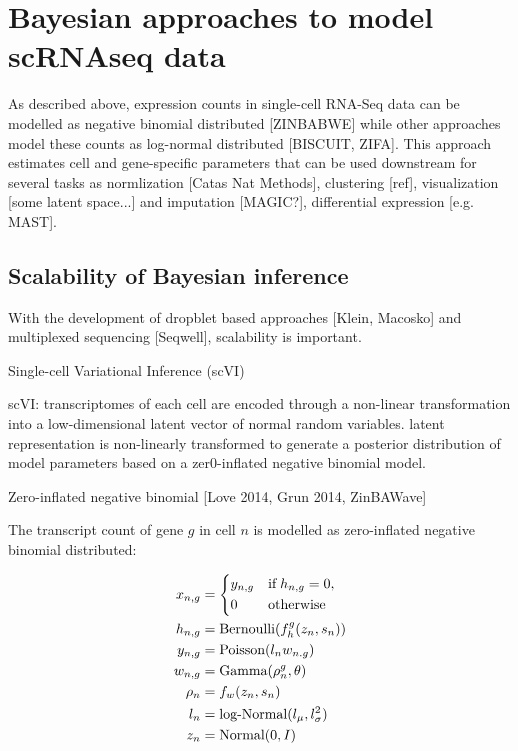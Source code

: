 
\section{Bayesian approaches to model scRNAseq data}

As described above, expression counts in single-cell RNA-Seq data can be modelled as negative binomial distributed [ZINBABWE] while other approaches model these counts as log-normal distributed [BISCUIT, ZIFA]. This approach estimates cell and gene-specific parameters that can be used downstream for several tasks as normlization [Catas Nat Methods], clustering [ref], visualization [some latent space...] and imputation [MAGIC?], differential expression [e.g. MAST].   


\subsection{Scalability of Bayesian inference}

With the development of dropblet based approaches [Klein, Macosko] and multiplexed sequencing [Seqwell], scalability is important. 

Single-cell Variational Inference (scVI) 

scVI: transcriptomes of each cell are encoded through a non-linear transformation into a low-dimensional latent vector of normal random variables. latent representation is non-linearly transformed to generate a posterior distribution of model parameters based on a zer0-inflated negative binomial model. 

Zero-inflated negative binomial [Love 2014, Grun 2014, ZinBAWave]

The transcript count of gene $g$ in cell $n$ is modelled as zero-inflated negative binomial distributed:

\begin{align*}
x_{n,g} & = 
 \left\lbrace
  \begin{aligned}
    & y_{n,g} && \textnormal{if} \; h_{n,g} = 0,  \\ 
    & 0 && \textnormal{otherwise}    	    
  \end{aligned}
\right.\\
h_{n,g} & = \textnormal{Bernoulli}(f_h^g(z_n,s_n))\\
y_{n,g} & = \textnormal{Poisson}(l_nw_{n.g})\\
w_{n,g} & = \textnormal{Gamma}(\rho^g_n, \theta)\\
\rho_n & = f_w(z_n,s_n)\\
l_n & = \textnormal{log-Normal}(l_{\mu},l^2_{\sigma})\\
z_n & = \textnormal{Normal}(0,I)
\end{align*}

